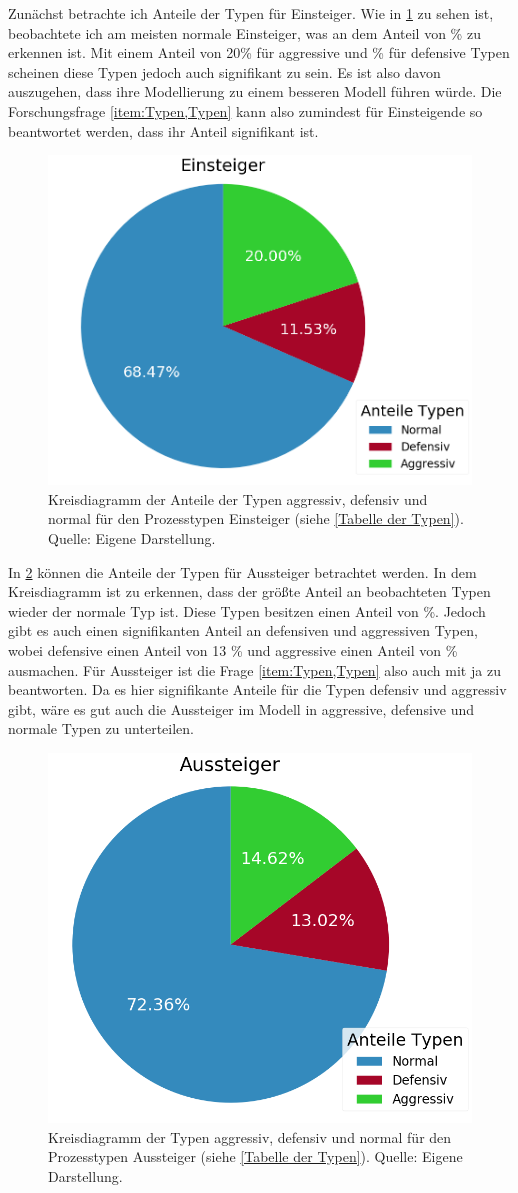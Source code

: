 Zunächst betrachte ich Anteile der Typen für Einsteiger.
Wie in \figurename \ref{fig:AnteileTypenEinsteiger} zu sehen ist, beobachtete ich am meisten normale Einsteiger, was an dem Anteil von  \% zu erkennen ist. Mit einem Anteil von 20\% für aggressive und \% für defensive Typen scheinen diese Typen jedoch auch signifikant zu sein. Es ist also davon auszugehen, dass ihre Modellierung zu einem besseren Modell führen würde. Die Forschungsfrage \ref{item:Typen,Typen} kann also zumindest für Einsteigende so beantwortet werden, dass ihr Anteil signifikant ist. 
\begin{figure}[H]
	\centering
		\includegraphics[height=0.35\textwidth]{pictures/data_evaluation/types/proportions_Einsteiger.png}
	\caption{Kreisdiagramm der Anteile der Typen aggressiv, defensiv und normal für den Prozesstypen Einsteiger (siehe \ref{Tabelle der Typen}). Quelle: Eigene Darstellung.}
	\label{fig:AnteileTypenEinsteiger}
\end{figure} 
In \figurename \ref{fig:AnteileTypenAussteiger} können die Anteile der Typen für Aussteiger betrachtet werden.
In dem Kreisdiagramm ist zu erkennen, dass der größte Anteil an beobachteten Typen wieder der normale Typ ist. Diese Typen besitzen einen Anteil von  \%. Jedoch gibt es auch einen signifikanten Anteil an defensiven und aggressiven Typen, wobei defensive einen Anteil von 13 \% und aggressive einen Anteil von  \% ausmachen. Für Aussteiger ist die Frage \ref{item:Typen,Typen} also auch mit ja zu beantworten. Da es hier signifikante Anteile für die Typen defensiv und aggressiv gibt, wäre es gut auch die Aussteiger im Modell in aggressive, defensive und normale Typen zu unterteilen. 
\begin{figure}[H]
	\centering
		\includegraphics[height=0.35\textwidth]{pictures/data_evaluation/types/proportions_Aussteiger.png}
	\caption{Kreisdiagramm der Typen aggressiv, defensiv und normal für den Prozesstypen Aussteiger (siehe \ref{Tabelle der Typen}). Quelle: Eigene Darstellung.}
	\label{fig:AnteileTypenAussteiger}
\end{figure}

